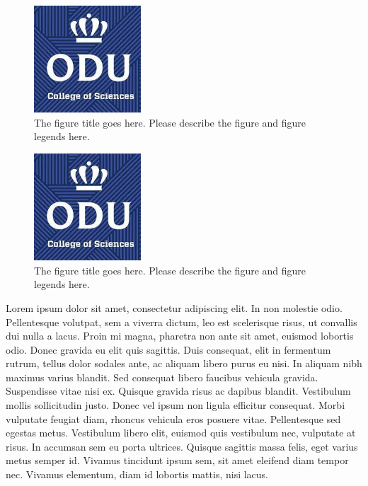 \begin{figure}[tbh]
  \centering
  \includegraphics[height=4cm]{Figures/cos1.jpeg}
  \caption[The figure title goes here.]{The figure title goes here. Please describe the figure and figure legends here.}
  \label{fig:cos1_2}
\end{figure}

\begin{figure}[tbh]
  \centering
  \includegraphics[height=4cm]{Figures/cos1.jpeg}
  \caption[The figure title goes here.]{The figure title goes here. Please describe the figure and figure legends here.}
  \label{fig:cos1_3}
\end{figure}

Lorem ipsum dolor sit amet, consectetur adipiscing elit. In non molestie odio. Pellentesque volutpat, sem a viverra dictum, leo est scelerisque risus, ut convallis dui nulla a lacus. Proin mi magna, pharetra non ante sit amet, euismod lobortis odio. Donec gravida eu elit quis sagittis. Duis consequat, elit in fermentum rutrum, tellus dolor sodales ante, ac aliquam libero purus eu nisi. In aliquam nibh maximus varius blandit. Sed consequat libero faucibus vehicula gravida. Suspendisse vitae nisi ex. Quisque gravida risus ac dapibus blandit. Vestibulum mollis sollicitudin justo. Donec vel ipsum non ligula efficitur consequat. Morbi vulputate feugiat diam, rhoncus vehicula eros posuere vitae. Pellentesque sed egestas metus. Vestibulum libero elit, euismod quis vestibulum nec, vulputate at risus. In accumsan sem eu porta ultrices. Quisque sagittis massa felis, eget varius metus semper id. Vivamus tincidunt ipsum sem, sit amet eleifend diam tempor nec. Vivamus elementum, diam id lobortis mattis, nisi lacus.

